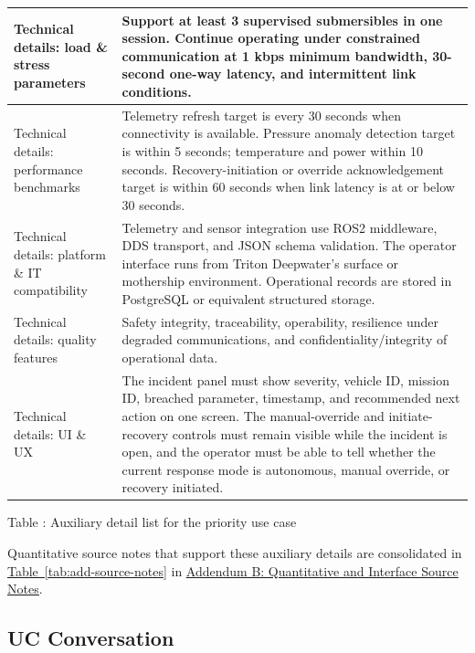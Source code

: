 \documentclass[10pt,a4paper]{article}
\let\orighyperref\hyperref
\renewcommand{\hyperref}[2][]{\orighyperref[#1]{\uline{#2}}}
\begin{document}
\begin{longtable}{|P{0.22\textwidth}|P{0.70\textwidth}|}
\hline
Technical details: load \& stress parameters & Support at least 3 supervised submersibles in one session. Continue operating under constrained communication at 1 kbps minimum bandwidth, 30-second one-way latency, and intermittent link conditions. \\
\hline
Technical details: performance benchmarks & Telemetry refresh target is every 30 seconds when connectivity is available. Pressure anomaly detection target is within 5 seconds; temperature and power within 10 seconds. Recovery-initiation or override acknowledgement target is within 60 seconds when link latency is at or below 30 seconds. \\
\hline
Technical details: platform \& IT compatibility & Telemetry and sensor integration use ROS2 middleware, DDS transport, and JSON schema validation. The operator interface runs from Triton Deepwater's surface or mothership environment. Operational records are stored in PostgreSQL or equivalent structured storage. \\
\hline
Technical details: quality features & Safety integrity, traceability, operability, resilience under degraded communications, and confidentiality/integrity of operational data. \\
\hline
Technical details: UI \& UX & The incident panel must show severity, vehicle ID, mission ID, breached parameter, timestamp, and recommended next action on one screen. The manual-override and initiate-recovery controls must remain visible while the incident is open, and the operator must be able to tell whether the current response mode is autonomous, manual override, or recovery initiated. \\
\end{longtable}
\label{tab:uc-aux}
\begin{center}
\small Table \thetable: Auxiliary detail list for the priority use case
\end{center}
\normalsize

\noindent Quantitative source notes that support these auxiliary details are consolidated in \hyperref[tab:add-source-notes]{Table~\ref*{tab:add-source-notes}} in \hyperref[add:source-notes]{Addendum B: Quantitative and Interface Source Notes}.

\subsection*{UC Conversation}
{}
\label{sec:uc-conversation}
\end{document}
